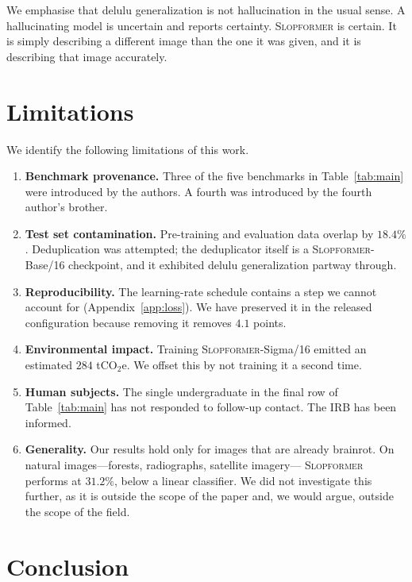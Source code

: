 \documentclass[10pt]{article}
\newcommand{\slop}{\textsc{Slopformer}}
\begin{document}
We emphasise that delulu generalization is not hallucination in the usual
sense. A hallucinating model is uncertain and reports certainty. \slop{} is
certain. It is simply describing a different image than the one it was given,
and it is describing that image accurately.

\section{Limitations}
\label{sec:limitations}

We identify the following limitations of this work.

\begin{enumerate}\itemsep0.15em
  \item \textbf{Benchmark provenance.} Three of the five benchmarks in
    Table~\ref{tab:main} were introduced by the authors. A fourth was
    introduced by the fourth author's brother.
  \item \textbf{Test set contamination.} Pre-training and evaluation data
    overlap by $18.4\%$. Deduplication was attempted; the deduplicator itself
    is a \slop{}-Base/16 checkpoint, and it exhibited delulu generalization
    partway through.
  \item \textbf{Reproducibility.} The learning-rate schedule contains a step we
    cannot account for (Appendix~\ref{app:loss}). We have preserved it in the
    released configuration because removing it removes $4.1$ points.
  \item \textbf{Environmental impact.} Training \slop{}-Sigma/16 emitted an
    estimated $284$ tCO$_2$e. We offset this by not training it a second time.
  \item \textbf{Human subjects.} The single undergraduate in the final row of
    Table~\ref{tab:main} has not responded to follow-up contact. The IRB has
    been informed.
  \item \textbf{Generality.} Our results hold only for images that are already
    brainrot. On natural images---forests, radiographs, satellite imagery---
    \slop{} performs at $31.2\%$, below a linear classifier. We did not
    investigate this further, as it is outside the scope of the paper and, we
    would argue, outside the scope of the field.
\end{enumerate}

\section{Conclusion}
\label{sec:conclusion}
\end{document}

